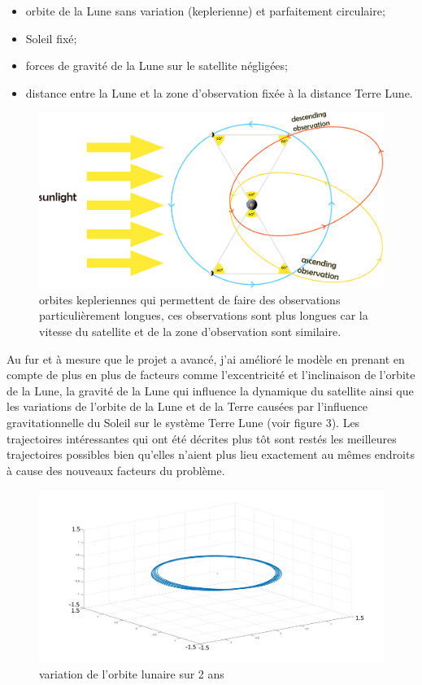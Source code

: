 \documentclass[11pt]{article} %
\begin{document}
		\begin{itemize}
			\item orbite de la Lune sans variation (keplerienne) et parfaitement circulaire;
			\item Soleil fixé;
			\item forces de gravité de la Lune sur le satellite négligées;
			\item distance entre la Lune et la zone d'observation fixée à la distance Terre Lune.
		\end{itemize}
		
		\begin{figure}[h]
			\includegraphics[width=18cm]{images/observations_main.png}
			\caption{orbites kepleriennes qui permettent de faire des observations particulièrement longues, ces observations sont plus longues car la vitesse du satellite et de la zone d'observation sont similaire.}
		\end{figure}
		Au fur et à mesure que le projet a avancé, j'ai amélioré le modèle en prenant en compte de plus en plus de facteurs comme l'excentricité et l'inclinaison de l'orbite de la Lune, la gravité de la Lune qui influence la dynamique du satellite ainsi que les variations de l'orbite de la Lune et de la Terre causées par l'influence gravitationnelle du Soleil sur le système Terre Lune (voir figure 3). Les trajectoires intéressantes qui ont été décrites plus tôt sont restés les meilleures trajectoires possibles bien qu'elles n'aient plus lieu exactement au mêmes endroits à cause des nouveaux facteurs du problème.
		\begin{figure}[h]
			\includegraphics[width=1\textwidth]{images/moon_orbit.jpg}
			\caption{variation de l'orbite lunaire sur 2 ans}
		\end{figure}
		
\end{document}
